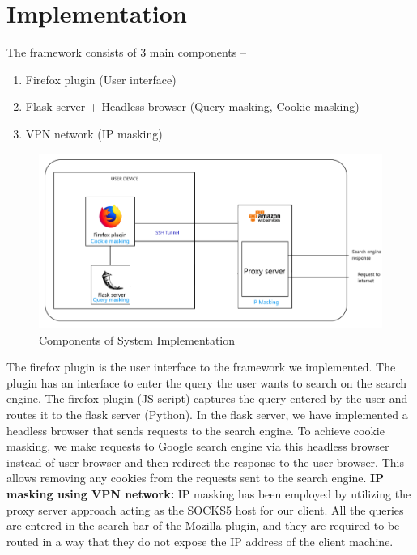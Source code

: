 \documentclass[10pt, a4paper, twocolumn]{article} %
\begin{document}
\section{Implementation}

The framework consists of 3 main components – 
\begin{enumerate}
\item Firefox plugin (User interface)
\item Flask server + Headless browser (Query masking, Cookie masking)
\item VPN network (IP masking)
\end{enumerate}
\begin{figure}
	\includegraphics[width=\linewidth]{arch.png} %
	\caption{Components of System Implementation} %
	\label{ARCH} %
\end{figure}
The firefox plugin is the user interface to the framework we implemented. The plugin has an interface to enter the query the user wants to search on the search engine. The firefox plugin (JS script) captures the query entered by the user and routes it to the flask server (Python). In the flask server, we have implemented a headless browser that sends requests to the search engine. To achieve cookie masking, we make requests to Google search engine via this headless browser instead of user browser and then redirect the response to the user browser. This allows removing any cookies from the requests sent to the search engine.  \newline
\textbf{IP masking using VPN network:}\newline
IP masking has been employed by utilizing the proxy server approach acting as the SOCKS5 host for our client. All the queries are entered in the search bar of the Mozilla plugin, and they are required to be routed in a way that they do not expose the IP address of the client machine. \newline
\end{document}
